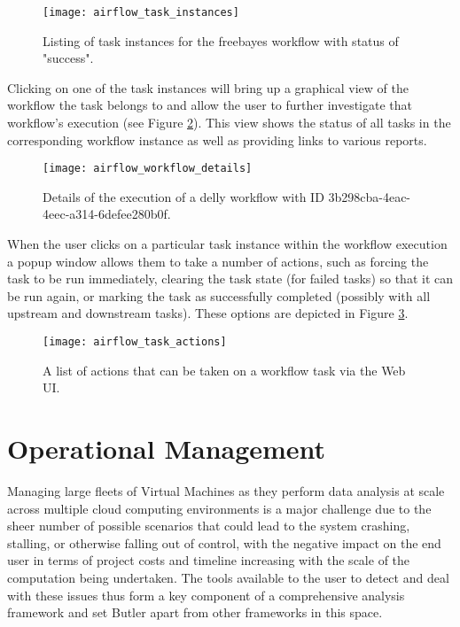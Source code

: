 \begin{figure}[h]
\texttt{[image: airflow\_task\_instances]}
\centering
\caption {Listing of task instances for the freebayes workflow with status of "success".}
\label{fig:airflow_task_instances}
\end{figure}

Clicking on one of the task instances will bring up a graphical view of the workflow the task belongs to and allow the user to further investigate that workflow's execution (see Figure \ref{fig:airflow_workflow_details}). This view shows the status of all tasks in the corresponding workflow instance as well as providing links to various reports.

\begin{figure}[h]
\texttt{[image: airflow\_workflow\_details]}
\centering
\caption {Details of the execution of a delly workflow with ID 3b298cba-4eac-4eec-a314-6defee280b0f.}
\label{fig:airflow_workflow_details}
\end{figure}

When the user clicks on a particular task instance within the workflow execution a popup window allows them to take a number of actions, such as forcing the task to be run immediately, clearing the task state (for failed tasks) so that it can be run again, or marking the task as successfully completed (possibly with all upstream and downstream tasks). These options are depicted in Figure \ref{fig:airflow_task_actions}.

\begin{figure}[h]
\texttt{[image: airflow\_task\_actions]}
\centering
\caption {A list of actions that can be taken on a workflow task via the Web UI.}
\label{fig:airflow_task_actions}
\end{figure}

\section{Operational Management}\label{sec:operational_management}

Managing large fleets of Virtual Machines as they perform data analysis at scale across multiple cloud computing environments is a major challenge due to the sheer number of possible scenarios that could lead to the system crashing, stalling, or otherwise falling out of control, with the negative impact on the end user in terms of project costs and timeline increasing with the scale of the computation being undertaken. The tools available to the user to detect and deal with these issues thus form a key component of a comprehensive analysis framework and set Butler apart from other frameworks in this space.

